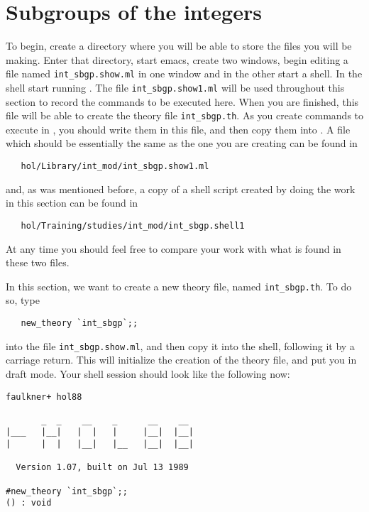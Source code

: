 \section{Subgroups of the integers}

To begin, create a directory where you will be able to store the files
you will be making.  Enter that directory, start emacs, create two
windows, begin editing a file named
{\small\verb+int_sbgp.show.ml+} in one window and in the other
start a shell.  In the shell start running \HOL.  The file
{\small\verb+int_sbgp.show1.ml+} will be used throughout this
section to record the commands to be executed here.  When you are
finished, this file will be able to create the theory file
{\small\verb+int_sbgp.th+}.  As you create commands to execute in
\HOL, you should write them in this file, and then copy them into
\HOL.  A file which should be essentially the same as the one you are
creating can be found in
\begin{verbatim}
   hol/Library/int_mod/int_sbgp.show1.ml
\end{verbatim}
and, as was mentioned before, a copy of a shell script created by doing
the work in this section can be found in
\begin{verbatim}
   hol/Training/studies/int_mod/int_sbgp.shell1
\end{verbatim}
At any time you should feel free to compare your work with what is
found in these two files.

In this section, we want to create a new theory file, named
{\small\verb+int_sbgp.th+}.  To do so, type
\begin{verbatim}
   new_theory `int_sbgp`;;
\end{verbatim}
into the file {\small\verb+int_sbgp.show.ml+}, and then copy it
into the shell, following it by a carriage return.  This will
initialize the creation of the theory file, and put you in draft mode.
Your shell session should look like the following now:

\setcounter{sessioncount}{1}
\begin{session}
\begin{verbatim}
faulkner+ hol88

       _  _    __    _      __    __
|___   |__|   |  |   |     |__|  |__|
|      |  |   |__|   |__   |__|  |__|

  Version 1.07, built on Jul 13 1989

#new_theory `int_sbgp`;;
() : void
\end{verbatim}
\end{session}

